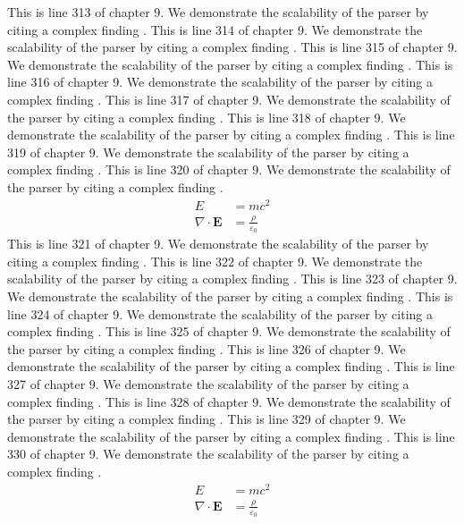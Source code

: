 This is line 313 of chapter 9. We demonstrate the scalability of the parser by citing a complex finding \cite{ref9_313}.
This is line 314 of chapter 9. We demonstrate the scalability of the parser by citing a complex finding \cite{ref9_314}.
This is line 315 of chapter 9. We demonstrate the scalability of the parser by citing a complex finding \cite{ref9_315}.
This is line 316 of chapter 9. We demonstrate the scalability of the parser by citing a complex finding \cite{ref9_316}.
This is line 317 of chapter 9. We demonstrate the scalability of the parser by citing a complex finding \cite{ref9_317}.
This is line 318 of chapter 9. We demonstrate the scalability of the parser by citing a complex finding \cite{ref9_318}.
This is line 319 of chapter 9. We demonstrate the scalability of the parser by citing a complex finding \cite{ref9_319}.
This is line 320 of chapter 9. We demonstrate the scalability of the parser by citing a complex finding \cite{ref9_320}.
\begin{align*}
  E &= mc^2 \\
  \nabla \cdot \mathbf{E} &= \frac{\rho}{\varepsilon_0}
\end{align*}
This is line 321 of chapter 9. We demonstrate the scalability of the parser by citing a complex finding \cite{ref9_321}.
This is line 322 of chapter 9. We demonstrate the scalability of the parser by citing a complex finding \cite{ref9_322}.
This is line 323 of chapter 9. We demonstrate the scalability of the parser by citing a complex finding \cite{ref9_323}.
This is line 324 of chapter 9. We demonstrate the scalability of the parser by citing a complex finding \cite{ref9_324}.
This is line 325 of chapter 9. We demonstrate the scalability of the parser by citing a complex finding \cite{ref9_325}.
This is line 326 of chapter 9. We demonstrate the scalability of the parser by citing a complex finding \cite{ref9_326}.
This is line 327 of chapter 9. We demonstrate the scalability of the parser by citing a complex finding \cite{ref9_327}.
This is line 328 of chapter 9. We demonstrate the scalability of the parser by citing a complex finding \cite{ref9_328}.
This is line 329 of chapter 9. We demonstrate the scalability of the parser by citing a complex finding \cite{ref9_329}.
This is line 330 of chapter 9. We demonstrate the scalability of the parser by citing a complex finding \cite{ref9_330}.
\begin{align*}
  E &= mc^2 \\
  \nabla \cdot \mathbf{E} &= \frac{\rho}{\varepsilon_0}
\end{align*}
